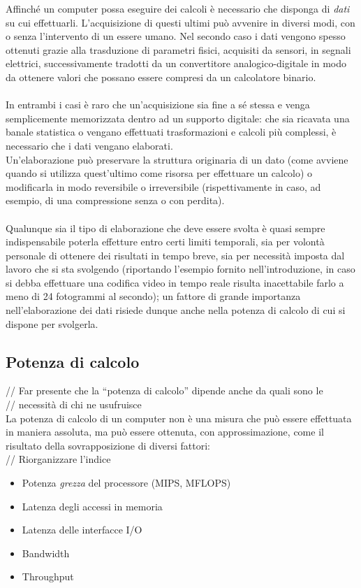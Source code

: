 Affinché un computer possa eseguire dei calcoli è necessario che disponga di
\emph{dati} su cui effettuarli. L'acquisizione di questi ultimi può avvenire
in diversi modi, con o senza l'intervento di un essere umano.
Nel secondo caso i dati vengono spesso ottenuti grazie alla trasduzione 
di parametri fisici, acquisiti da sensori, in segnali elettrici, successivamente
tradotti da un convertitore analogico-digitale in modo da ottenere valori che 
possano essere compresi da un calcolatore binario.
\\ \\
In entrambi i casi è raro che un'acquisizione sia fine a sé stessa e venga
semplicemente memorizzata dentro ad un supporto digitale: che sia ricavata una
banale statistica o vengano effettuati trasformazioni e calcoli più complessi,
è necessario che i dati vengano elaborati. \\
Un'elaborazione può preservare la struttura originaria di un dato (come avviene
quando si utilizza quest'ultimo come risorsa per effettuare un calcolo) o
modificarla in modo reversibile o irreversibile (rispettivamente in caso, ad
esempio, di una compressione senza o con perdita). 
\\ \\
Qualunque sia il tipo di elaborazione che deve essere svolta è quasi sempre
indispensabile poterla effetture entro certi limiti temporali, sia per
volontà personale di ottenere dei risultati in tempo breve, sia per
necessità imposta dal lavoro che si sta svolgendo (riportando l'esempio fornito
nell'introduzione, in caso si debba effettuare una codifica video in tempo reale
risulta inacettabile farlo a meno di 24 fotogrammi al secondo); un fattore di
grande importanza nell'elaborazione dei dati risiede dunque anche nella potenza
di calcolo di cui si dispone per svolgerla.
\subsection{Potenza di calcolo}
// Far presente che la ``potenza di calcolo'' dipende anche da quali sono le \\
// necessità di chi ne usufruisce \\
La potenza di calcolo di un computer non è una misura che può essere effettuata
in maniera assoluta, ma può essere ottenuta, con approssimazione, come il 
risultato della sovrapposizione di diversi fattori:\\
// Riorganizzare l'indice
\begin{itemize}
\item Potenza \emph{grezza} del processore (MIPS, MFLOPS)
\item Latenza degli accessi in memoria
\item Latenza delle interfacce I/O
\item Bandwidth
\item Throughput
\end{itemize}


